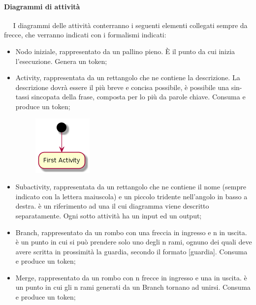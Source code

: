 	    \paragraph{Diagrammi di attività}~\newline ~\newline
	    I diagrammi delle attività conterranno i seguenti elementi collegati sempre da frecce, che verranno indicati con i formalismi indicati:
	    \begin{itemize}
	        \item Nodo iniziale, rappresentato da un pallino pieno. È il punto da cui inizia l’esecuzione. Genera un token;
            \item Activity, rappresentata da un rettangolo che ne contiene la descrizione. La descrizione dovrà essere il più breve e concisa possibile, è possibile una sin- tassi sincopata della frase, composta per lo più da parole chiave. Consuma e produce un token;
            \begin{figure}[!htbp]
    		    \centering
    		    \includegraphics{firstActivity.png}
	        \end{figure}
	        \item Subactivity, rappresentata da un rettangolo che ne contiene il nome (sempre indicato con la lettera maiuscola) e un piccolo tridente nell'angolo in basso a destra. è un riferimento ad una il cui diagramma viene descritto separatamente. Ogni sotto attività ha un input ed un output;
            \item Branch, rappresentato da un rombo con una freccia in ingresso e n in uscita. è un punto in cui si può prendere solo uno degli n rami, ognuno dei quali deve avere scritta in prossimità la guardia, secondo il formato [guardia]. Consuma e produce un token;
            \item Merge, rappresentato da un rombo con n frecce in ingresso e una in uscita. è un punto in cui gli n rami generati da un Branch tornano ad unirsi. Consuma e produce un token;\par
            \begin{figure}[!htbp]
    		    \centering

\end{figure}
\end{itemize}
